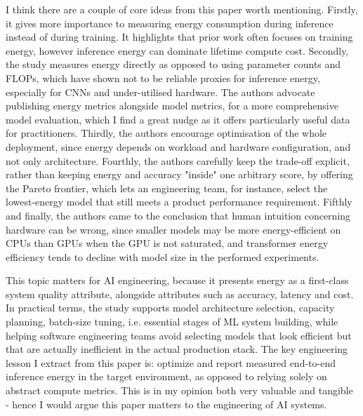 \documentclass[11pt]{article}
\begin{document}
I think there are a couple of core ideas from this paper worth mentioning. Firstly, it gives more importance to measuring energy consumption during inference instead of during training. It highlights that prior work often focuses on training energy, however inference energy can dominate lifetime compute cost. Secondly, the study measures energy directly as opposed to using parameter counts and FLOPs, which have shown not to be reliable proxies for inference energy, especially for CNNs and under-utilised hardware. The authors advocate publishing energy metrics alongside model metrics, for a more comprehensive model evaluation, which I find a great nudge as it offers particularly useful data for practitioners. Thirdly, the authors encourage optimisation of the whole deployment, since energy depends on workload and hardware configuration, and not only architecture. Fourthly, the authors carefully keep the trade-off explicit, rather than keeping energy and accuracy "inside" one arbitrary score, by offering the Pareto frontier, which lets an engineering team, for instance, select the lowest-energy model that still meets a product performance requirement. Fifthly and finally, the authors came to the conclusion that human intuition concerning hardware can be wrong, since smaller models may be more energy-efficient on CPUs than GPUs when the GPU is not saturated, and transformer energy efficiency tends to decline with model size in the performed experiments.

This topic matters for AI engineering, because it presents energy as a first-class system quality attribute, alongside attributes such as accuracy, latency and cost. In practical terms, the study supports model architecture selection, capacity planning, batch-size tuning, i.e. essential stages of ML system building, while helping software engineering teams avoid selecting models that look efficient but that are actually inefficient in the actual production stack. The key engineering lesson I extract from this paper is: optimize and report measured end-to-end inference energy in the target environment, as opposed to relying solely on abstract compute metrics. This is in my opinion both very valuable and tangible - hence I would argue this paper matters to the engineering of AI systems.
\end{document}
